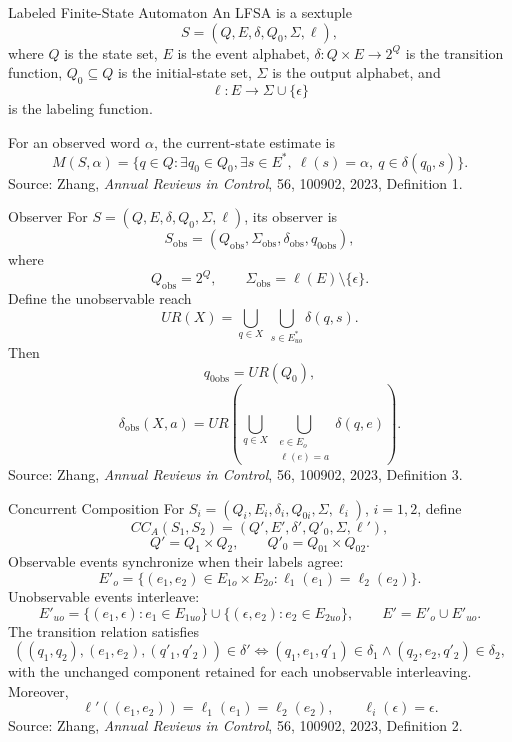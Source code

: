 \documentclass[10pt]{beamer}
\begin{document}
\begin{frame}{Labeled Finite-State Automaton}
  \small
  An LFSA is a sextuple
  \[
    S=(Q,E,\delta,Q_0,\Sigma,\ell),
  \]
  where $Q$ is the state set, $E$ is the event alphabet,
  $\delta:Q\times E\rightarrow 2^Q$ is the transition function,
  $Q_0\subseteq Q$ is the initial-state set, $\Sigma$ is the output
  alphabet, and
  \[
    \ell:E\rightarrow\Sigma\cup\{\epsilon\}
  \]
  is the labeling function.

  For an observed word $\alpha$, the current-state estimate is
  \[
    M(S,\alpha)=\{q\in Q:\exists q_0\in Q_0,\exists s\in E^*,
    \ \ell(s)=\alpha,\ q\in\delta(q_0,s)\}.
  \]
  \vfill
  {\tiny Source: Zhang, \textit{Annual Reviews in Control}, 56, 100902, 2023, Definition 1.}
\end{frame}

\begin{frame}{Observer}
  \small
  For $S=(Q,E,\delta,Q_0,\Sigma,\ell)$, its observer is
  \[
    S_{\mathrm{obs}}=(Q_{\mathrm{obs}},\Sigma_{\mathrm{obs}},
    \delta_{\mathrm{obs}},q_{0 \mathrm{obs}}),
  \]
  where
  \[
    Q_{\mathrm{obs}}=2^Q,
    \qquad
    \Sigma_{\mathrm{obs}}=\ell(E)\setminus\{\epsilon\}.
  \]
  Define the unobservable reach
  \[
    UR(X)=\bigcup_{q\in X}\ \bigcup_{s\in E_{uo}^*}\delta(q,s).
  \]
  Then
  \[
    q_{0 \mathrm{obs}}=UR(Q_0),
  \]
  \[
    \delta_{\mathrm{obs}}(X,a)=UR\!\left(
    \bigcup_{q\in X}\ \bigcup_{\substack{e\in E_o\\\ell(e)=a}}
    \delta(q,e)\right).
  \]
  \vfill
  {\tiny Source: Zhang, \textit{Annual Reviews in Control}, 56, 100902, 2023, Definition 3.}
\end{frame}

\begin{frame}{Concurrent Composition}
  \scriptsize
  For $S_i=(Q_i,E_i,\delta_i,Q_{0i},\Sigma,\ell_i)$, $i=1,2$, define
  \[
    CC_A(S_1,S_2)=(Q',E',\delta',Q'_0,\Sigma,\ell'),
  \]
  \[
    Q'=Q_1\times Q_2,
    \qquad Q'_0=Q_{01}\times Q_{02}.
  \]
  Observable events synchronize when their labels agree:
  \[
    E'_o=\{(e_1,e_2)\in E_{1o}\times E_{2o}:
    \ell_1(e_1)=\ell_2(e_2)\}.
  \]
  Unobservable events interleave:
  \[
    E'_{uo}=\{(e_1,\epsilon):e_1\in E_{1uo}\}
    \cup\{(\epsilon,e_2):e_2\in E_{2uo}\},
    \qquad E'=E'_o\cup E'_{uo}.
  \]
  The transition relation satisfies
  \[
    ((q_1,q_2),(e_1,e_2),(q'_1,q'_2))\in\delta'
    \iff (q_1,e_1,q'_1)\in\delta_1\land(q_2,e_2,q'_2)\in\delta_2,
  \]
  with the unchanged component retained for each unobservable interleaving.
  Moreover,
  \[
    \ell'((e_1,e_2))=\ell_1(e_1)=\ell_2(e_2),
    \qquad \ell_i(\epsilon)=\epsilon.
  \]
  \vfill
  {\tiny Source: Zhang, \textit{Annual Reviews in Control}, 56, 100902, 2023, Definition 2.}
\end{frame}
\end{document}
